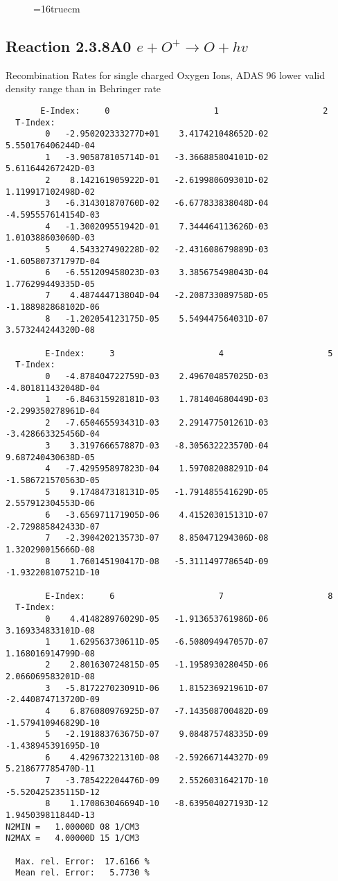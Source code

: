 \documentclass[12pt,dvipdfmx]{article}
\begin{document}
\begin{figure} \label{2.3.7A0}
\epsfxsize=16truecm 
\end{figure}
\newpage

\subsection{
Reaction 2.3.8A0  $e + O^{+} \rightarrow O + hv$ }
 Recombination Rates for single  charged Oxygen Ions, ADAS 96
 lower valid density range than in Behringer rate

\begin{small}\begin{verbatim}
       E-Index:     0                     1                     2
  T-Index:
        0   -2.950202333277D+01    3.417421048652D-02    5.550176406244D-04
        1   -3.905878105714D-01   -3.366885804101D-02    5.611644267242D-03
        2    8.142161905922D-01   -2.619980609301D-02    1.119917102498D-02
        3   -6.314301870760D-02   -6.677833838048D-04   -4.595557614154D-03
        4   -1.300209551942D-01    7.344464113626D-03    1.010388603060D-03
        5    4.543327490228D-02   -2.431608679889D-03   -1.605807371797D-04
        6   -6.551209458023D-03    3.385675498043D-04    1.776299449335D-05
        7    4.487444713804D-04   -2.208733089758D-05   -1.188982868102D-06
        8   -1.202054123175D-05    5.549447564031D-07    3.573244244320D-08

        E-Index:     3                     4                     5
  T-Index:
        0   -4.878404722759D-03    2.496704857025D-03   -4.801811432048D-04
        1   -6.846315928181D-03    1.781404680449D-03   -2.299350278961D-04
        2   -7.650465593431D-03    2.291477501261D-03   -3.428663325456D-04
        3    3.319766657887D-03   -8.305632223570D-04    9.687240430638D-05
        4   -7.429595897823D-04    1.597082088291D-04   -1.586721570563D-05
        5    9.174847318131D-05   -1.791485541629D-05    2.557912304553D-06
        6   -3.656971171905D-06    4.415203015131D-07   -2.729885842433D-07
        7   -2.390420213573D-07    8.850471294306D-08    1.320290015666D-08
        8    1.760145190417D-08   -5.311149778654D-09   -1.932208107521D-10

        E-Index:     6                     7                     8
  T-Index:
        0    4.414828976029D-05   -1.913653761986D-06    3.169334833101D-08
        1    1.629563730611D-05   -6.508094947057D-07    1.168016914799D-08
        2    2.801630724815D-05   -1.195893028045D-06    2.066069583201D-08
        3   -5.817227023091D-06    1.815236921961D-07   -2.440874713720D-09
        4    6.876080976925D-07   -7.143508700482D-09   -1.579410946829D-10
        5   -2.191883763675D-07    9.084875748335D-09   -1.438945391695D-10
        6    4.429673221310D-08   -2.592667144327D-09    5.218677785470D-11
        7   -3.785422204476D-09    2.552603164217D-10   -5.520425235115D-12
        8    1.170863046694D-10   -8.639504027193D-12    1.945039811844D-13
N2MIN =   1.00000D 08 1/CM3
N2MAX =   4.00000D 15 1/CM3

  Max. rel. Error:  17.6166 %
  Mean rel. Error:   5.7730 %

\end{verbatim}\end{small}
\end{document}
